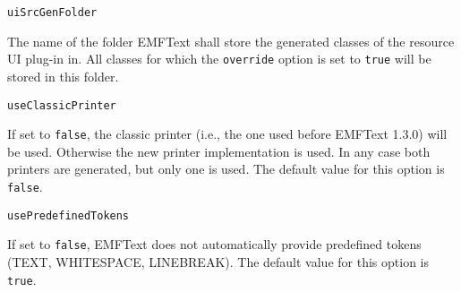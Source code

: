 \noindent\texttt{uiSrcGenFolder}
\begin{myindentpar}{1cm}
The name of the folder EMFText shall store the generated classes of the resource UI plug-in in. All classes for which the \texttt{override} option is set to \texttt{true} will be stored in this folder.
\end{myindentpar}

\noindent\texttt{useClassicPrinter}
\begin{myindentpar}{1cm}
If set to \texttt{false}, the classic printer (i.e., the one used before EMFText 1.3.0) will be used. Otherwise the new printer implementation is used. In any case both printers are generated, but only one is used. The default value for this option is \texttt{false}.
\end{myindentpar}

\noindent\texttt{usePredefinedTokens}
\begin{myindentpar}{1cm}
If set to \texttt{false}, EMFText does not automatically provide predefined tokens (TEXT, WHITESPACE, LINEBREAK). The default value for this option is \texttt{true}.
\end{myindentpar}

